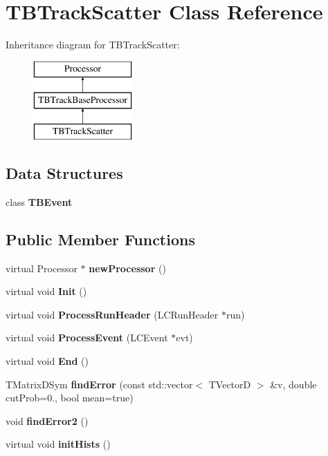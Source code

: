 \section{T\-B\-Track\-Scatter Class Reference}
\label{classTBTrackScatter}
Inheritance diagram for T\-B\-Track\-Scatter\-:\begin{figure}[H]
\begin{center}
\leavevmode
\includegraphics[height=3.000000cm]{classTBTrackScatter}
\end{center}
\end{figure}
\subsection*{Data Structures}
\begin{DoxyCompactItemize}
\item 
class {\bf T\-B\-Event}
\end{DoxyCompactItemize}
\subsection*{Public Member Functions}
\begin{DoxyCompactItemize}
\item 
virtual Processor $\ast$ {\bfseries new\-Processor} ()\label{classTBTrackScatter_add1e78763f106644f161ba177f5f21e3}

\item 
virtual void {\bfseries Init} ()\label{classTBTrackScatter_a82431b4518ed55dbdf953ac15cdfc710}

\item 
virtual void {\bfseries Process\-Run\-Header} (L\-C\-Run\-Header $\ast$run)\label{classTBTrackScatter_ae27794c29359577e8278753bb7c74ead}

\item 
virtual void {\bfseries Process\-Event} (L\-C\-Event $\ast$evt)\label{classTBTrackScatter_a328a0b121402a3779882e39ecc575934}

\item 
virtual void {\bfseries End} ()\label{classTBTrackScatter_a1c5d977fb520115d85706dd7f3794edd}

\item 
T\-Matrix\-D\-Sym {\bfseries find\-Error} (const std\-::vector$<$ T\-Vector\-D $>$ \&v, double cut\-Prob=0., bool mean=true)\label{classTBTrackScatter_aa6ff59b2691627b05c8726740215c81a}

\item 
void {\bfseries find\-Error2} ()\label{classTBTrackScatter_a4350eab83583bce7b782f95bf9ffca20}

\item 
virtual void {\bfseries init\-Hists} ()\label{classTBTrackScatter_ac27b4d5c266645c0b7869ec8301bb6af}

\end{DoxyCompactItemize}
